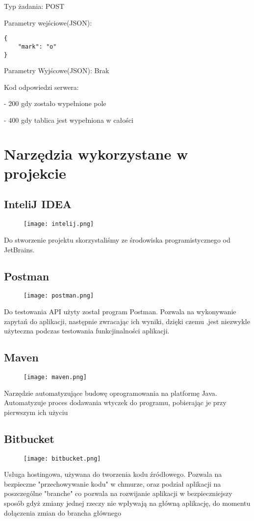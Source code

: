 \documentclass{article}
\begin{document}
Typ żadania: POST

Parametry wejściowe(JSON): 

\begin{lstlisting}
{
    "mark": "o"
}
\end{lstlisting}

Parametry Wyjścowe(JSON): Brak 

Kod odpowiedzi serwera:

- 200 gdy zostało wypełnione pole

- 400 gdy tablica jest wypełniona w całości



\section{Narzędzia wykorzystane w projekcie}
\subsection{InteliJ IDEA}
\begin{figure}[h!]
\centering
\texttt{[image: intelij.png]}
\end{figure}
Do stworzenie projektu skorzystaliśmy ze środowiska programistycznego od JetBrains.
\subsection{Postman}
\begin{figure}[h!]
\centering
\texttt{[image: postman.png]}
\end{figure}
Do testowania API użyty został program Postman.
Pozwala na wykonywanie zapytań do aplikacji, następnie zwracając ich wyniki, dzięki czemu .jest niezwykle użyteczna podczas testowania funkcjinalności aplikacji.
\newpage
\subsection{Maven}
\begin{figure}[h!]
\centering
\texttt{[image: maven.png]}
\end{figure}
Narzędzie automatyzujące budowę oprogramowania na platformę Java.
Automatyzuje proces dodawania wtyczek do programu, pobierając je przy pierwszym ich użyciu

\subsection{Bitbucket}
\begin{figure}[h!]
\centering
\texttt{[image: bitbucket.png]}
\end{figure}
Usługa hostingowa, używana do tworzenia kodu źródłowego.
Pozwala na bezpieczne "przechowywanie kodu" w chmurze, oraz podział aplikacji na poszczególne "branche" co pozwala na rozwijanie aplikacji w bezpieczniejszy sposób gdyż zmiany jednej rzeczy nie wpływają na główną aplikację, do momentu dołączenia zmian do brancha głównego
\end{document}
